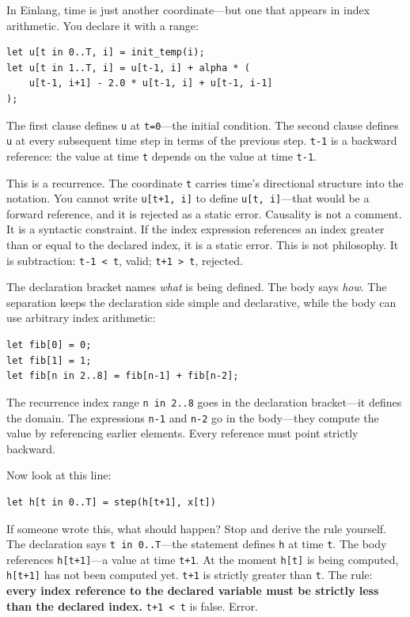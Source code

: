\documentclass[11pt,titlepage]{article}
\begin{document}
In Einlang, time is just another coordinate---but one that appears in
index arithmetic. You declare it with a range:

\begin{verbatim}
let u[t in 0..T, i] = init_temp(i);
let u[t in 1..T, i] = u[t-1, i] + alpha * (
    u[t-1, i+1] - 2.0 * u[t-1, i] + u[t-1, i-1]
);
\end{verbatim}

The first clause defines \texttt{u} at \texttt{t=0}---the initial
condition. The second clause defines \texttt{u} at every subsequent time
step in terms of the previous step. \texttt{t-1} is a backward
reference: the value at time \texttt{t} depends on the value at time
\texttt{t-1}.

This is a recurrence. The coordinate \texttt{t} carries time's
directional structure into the notation. You cannot write
\texttt{u{[}t+1,\ i{]}} to define \texttt{u{[}t,\ i{]}}---that would be
a forward reference, and it is rejected as a static error. Causality is
not a comment. It is a syntactic constraint. If the index expression
references an index greater than or equal to the declared index, it is a
static error. This is not philosophy. It is subtraction:
\texttt{t-1\ \textless{}\ t}, valid; \texttt{t+1\ \textgreater{}\ t},
rejected.

The declaration bracket names \emph{what} is being defined. The body
says \emph{how}. The separation keeps the declaration side simple and
declarative, while the body can use arbitrary index arithmetic:

\begin{verbatim}
let fib[0] = 0;
let fib[1] = 1;
let fib[n in 2..8] = fib[n-1] + fib[n-2];
\end{verbatim}

The recurrence index range \texttt{n\ in\ 2..8} goes in the declaration
bracket---it defines the domain. The expressions \texttt{n-1} and
\texttt{n-2} go in the body---they compute the value by referencing
earlier elements. Every reference must point strictly backward.

Now look at this line:

\begin{verbatim}
let h[t in 0..T] = step(h[t+1], x[t])
\end{verbatim}

If someone wrote this, what should happen? Stop and derive the rule
yourself. The declaration says \texttt{t\ in\ 0..T}---the statement
defines \texttt{h} at time \texttt{t}. The body references
\texttt{h{[}t+1{]}}---a value at time \texttt{t+1}. At the moment
\texttt{h{[}t{]}} is being computed, \texttt{h{[}t+1{]}} has not been
computed yet. \texttt{t+1} is strictly greater than \texttt{t}. The
rule: \textbf{every index reference to the declared variable must be
strictly less than the declared index.} \texttt{t+1\ \textless{}\ t} is
false. Error.
\end{document}
